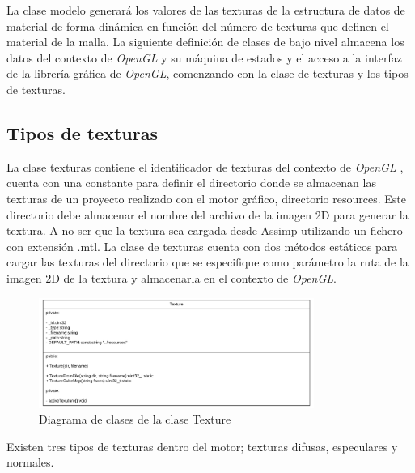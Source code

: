 \documentclass[a4paper]{book}
\begin{document}
La clase modelo generará los valores de las texturas de la estructura de datos de material de forma dinámica en función del número de
texturas que definen el material de la malla. La siguiente definición de clases de bajo nivel almacena los datos del contexto de
\textit{OpenGL} y su máquina de estados y el acceso a la interfaz de la librería gráfica de \textit{OpenGL}, comenzando con la clase de texturas
y los tipos de texturas.

\subsection{Tipos de texturas}
\label{subsec:Texturas}

La clase texturas contiene el identificador de texturas del contexto de \textit{OpenGL} , cuenta con una constante para definir el directorio
donde se almacenan las texturas de un proyecto realizado con el motor gráfico, directorio resources. Este directorio debe almacenar el
nombre del archivo de la imagen 2D para generar la textura. A no ser que la textura sea cargada desde Assimp utilizando un fichero
con extensión .mtl. La clase de texturas cuenta con dos métodos estáticos para cargar las texturas del directorio que se especifique
como parámetro la ruta de la imagen 2D de la textura y almacenarla en el contexto de \textit{OpenGL}.

\begin{figure}[H]
    \centering
    \includegraphics[width=9cm, keepaspectratio]{img/Texture.png}
    \caption{Diagrama de clases de la clase Texture}
    \label{Texture}
\end{figure}

Existen tres tipos de texturas dentro del motor; texturas difusas, especulares y normales. \cite{art:_blinn1976texture}
\end{document}
